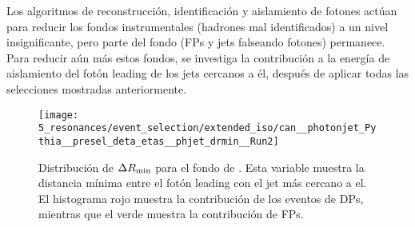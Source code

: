 Los algoritmos de reconstrucción, identificación y aislamiento de fotones actúan para reducir los fondos instrumentales (hadrones mal identificados) a un nivel insignificante, pero parte del fondo (\acp{FP} y jets falseando fotones) permanece.
Para reducir aún más estos fondos, se investiga la contribución a la energía de aislamiento del fotón leading de los jets cercanos a él, después de aplicar todas las selecciones mostradas anteriormente.

\begin{figure}[ht!]
    \centering
    \texttt{[image: 5\_resonances/event\_selection/extended\_iso/can\_\_photonjet\_Pythia\_\_presel\_deta\_etas\_\_phjet\_drmin\_\_Run2]}
    \caption{Distribución de \(\Delta R_{\text{min}}\) para el fondo de \gammajet. Esta variable muestra la distancia m\'inima entre el fotón leading con el jet más cercano a el. El histograma rojo muestra la contribución de los eventos de \acp{DP}, mientras que el verde muestra la contribución de \acp{FP}.}
    \label{fig:evt_selection:sr_opt:extended_iso:phjet_drmin}
\end{figure}

